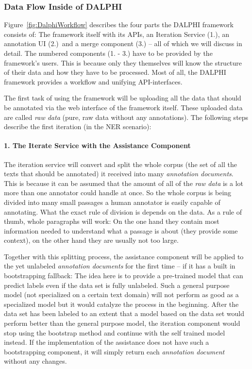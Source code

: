 	\subsubsection{Data Flow Inside of \acl{DALPHI}}
		\label{dalphiMergeService}

		Figure~\ref{fig:DalphiWorkflow} describes the four parts the \ac{DALPHI} framework consists of: The framework itself with its \acs{API}s, an Iteration Service (1.), an annotation \ac{UI} (2.)~and a merge component (3.) -- all of which we will discuss in detail. The numbered components (1. - 3.) have to be provided by the framework's users. This is because only they themselves will know the structure of their data and how they have to be processed. Most of all, the \ac{DALPHI} framework provides a workflow and unifying \ac{API}-interfaces.

		The first task of using the framework will be uploading all the data that should be annotated via the web interface of the framework itself. These uploaded data are called \textit{raw data} (pure, raw data without any annotations). The following steps describe the first iteration (in the \ac{NER} scenario):

		\paragraph{1. The Iterate Service with the Assistance Component}
		The iteration service will convert and split the whole corpus (the set of all the texts that should be annotated) it received into many \textit{annotation documents}. This is because it can be assumed that the amount of all of the \textit{raw data} is a lot more than one annotator could handle at once. So the whole corpus is being divided into many small passages a human annotator is easily capable of annotating. What the exact rule of division is depends on the data. As a rule of thumb, whole paragraphs will work: On the one hand they contain most information needed to understand what a passage is about (they provide some context), on the other hand they are usually not too large.

		Together with this splitting process, the assistance component will be applied to the yet unlabeled \textit{annotation documents} for the first time -- if it has a built in bootstrapping fallback: The idea here is to provide a pre-trained model that can predict labels even if the data set is fully unlabeled. Such a general purpose model (not specialized on a certain text domain) will not perform as good as a specialized model but it would catalyze the process in the beginning. After the data set has been labeled to an extent that a model based on the data set would perform better than the general purpose model, the iteration component would stop using the bootstrap method and continue with the self trained model instead. If the implementation of the assistance does not have such a bootstrapping component, it will simply return each \textit{annotation document} without any changes.

